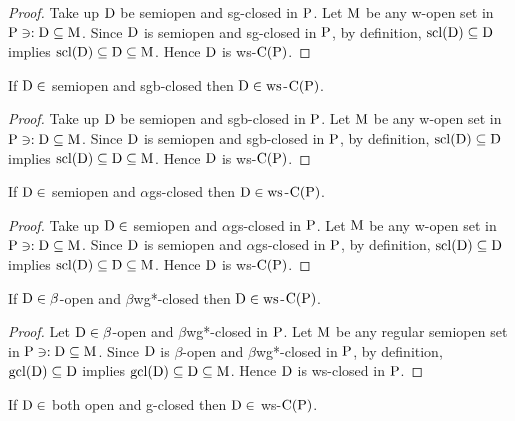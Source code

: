 \begin{proof}
Take up $\mathrm{D}$ be semiopen and sg-closed in $\mathrm{P}$. Let $\mathrm{M}$ be any w-open set in $\mathrm{P} \ni: \mathrm{D}\subseteq \mathrm{M}$. Since $\mathrm{D}$ is semiopen and sg-closed in $\mathrm{P}$, by definition, $\mathrm{scl}(\mathrm{D})\subseteq \mathrm{D}$ implies $\mathrm{scl}(\mathrm{D})\subseteq \mathrm{D}\subseteq \mathrm{M}$. Hence $\mathrm{D}$ is ws-$\mathrm{C}(\mathrm{P})$.
\end{proof}

\begin{thm}\label{thm2.2.40}
If $\mathrm{D}\in$ semiopen and sgb-closed then $\mathrm{D}\in\mathrm{ws}$-$\mathrm{C}(\mathrm{P})$.
\end{thm}

\begin{proof}
Take up $\mathrm{D}$ be semiopen and sgb-closed in $\mathrm{P}$. Let $\mathrm{M}$ be any w-open set in $\mathrm{P} \ni: \mathrm{D}\subseteq \mathrm{M}$. Since $\mathrm{D}$ is semiopen and sgb-closed in $\mathrm{P}$, by definition, $\mathrm{scl}(\mathrm{D})\subseteq \mathrm{D}$ implies $\mathrm{scl}(\mathrm{D})\subseteq \mathrm{D}\subseteq \mathrm{M}$. Hence $\mathrm{D}$ is ws-$\mathrm{C}(\mathrm{P})$.
\end{proof}

\begin{thm}\label{thm2.2.41}
If $\mathrm{D}\in$ semiopen and $\alpha$gs-closed then $\mathrm{D}\in\mathrm{ws}$-$\mathrm{C}(\mathrm{P})$.
\end{thm}

\begin{proof}
Take up $\mathrm{D}\in$ semiopen and $\alpha$gs-closed in $\mathrm{P}$. Let $\mathrm{M}$ be any w-open set in $\mathrm{P}\ni : \mathrm{D}\subseteq \mathrm{M}$. Since $\mathrm{D}$ is semiopen and $\alpha$gs-closed in $\mathrm{P}$, by definition, $\mathrm{scl}(\mathrm{D})\subseteq \mathrm{D}$ implies $\mathrm{scl}(\mathrm{D})\subseteq \mathrm{D}\subseteq \mathrm{M}$. Hence $\mathrm{D}$ is ws-$\mathrm{C}(\mathrm{P})$.
\end{proof}

\begin{thm}\label{thm2.2.42}
If $\mathrm{D}\in\beta$-open and $\beta$wg*-closed then $\mathrm{D}\in\mathrm{ws}$-$\mathrm{C}(\mathrm{P})$.
\end{thm}

\begin{proof}
Let $\mathrm{D}\in\beta$-open and $\beta$wg*-closed in $\mathrm{P}$. Let $\mathrm{M}$ be any regular semiopen set in $\mathrm{P}\ni : \mathrm{D}\subseteq \mathrm{M}$. Since $\mathrm{D}$ is $\beta$-open and $\beta$wg*-closed in $\mathrm{P}$, by definition, $\mathrm{gcl}(\mathrm{D})\subseteq \mathrm{D}$ implies $\mathrm{gcl}(\mathrm{D})\subseteq \mathrm{D}\subseteq \mathrm{M}$. Hence $\mathrm{D}$ is ws-closed in $\mathrm{P}$.
\end{proof}

\begin{thm}\label{thm2.2.43}
If $\mathrm{D}\in$ both open and g-closed then $\mathrm{D}\in$ ws-$\mathrm{C}(\mathrm{P})$.
\end{thm}

